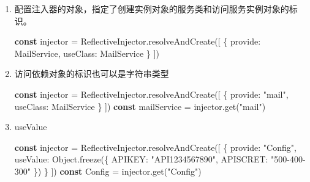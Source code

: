 \documentclass[
]{article}
\newenvironment{Shaded}{}{}
\newcommand{\BuiltInTok}[1]{#1}
\newcommand{\DataTypeTok}[1]{\textcolor[rgb]{0.56,0.13,0.00}{#1}}
\newcommand{\FunctionTok}[1]{\textcolor[rgb]{0.02,0.16,0.49}{#1}}
\newcommand{\KeywordTok}[1]{\textcolor[rgb]{0.00,0.44,0.13}{\textbf{#1}}}
\newcommand{\NormalTok}[1]{#1}
\newcommand{\OperatorTok}[1]{\textcolor[rgb]{0.40,0.40,0.40}{#1}}
\newcommand{\StringTok}[1]{\textcolor[rgb]{0.25,0.44,0.63}{#1}}
\begin{document}
\begin{enumerate}
\def\labelenumi{\arabic{enumi}.}
\item
  配置注入器的对象，指定了创建实例对象的服务类和访问服务实例对象的标识。

\begin{Shaded}
\begin{Highlighting}[]
\KeywordTok{const}\NormalTok{ injector }\OperatorTok{=}\NormalTok{ ReflectiveInjector}\OperatorTok{.}\FunctionTok{resolveAndCreate}\NormalTok{([}
\NormalTok{  \{ }\DataTypeTok{provide}\OperatorTok{:}\NormalTok{ MailService}\OperatorTok{,} \DataTypeTok{useClass}\OperatorTok{:}\NormalTok{ MailService \}}
\NormalTok{])}
\end{Highlighting}
\end{Shaded}
\item
  访问依赖对象的标识也可以是字符串类型

\begin{Shaded}
\begin{Highlighting}[]
\KeywordTok{const}\NormalTok{ injector }\OperatorTok{=}\NormalTok{ ReflectiveInjector}\OperatorTok{.}\FunctionTok{resolveAndCreate}\NormalTok{([}
\NormalTok{  \{ }\DataTypeTok{provide}\OperatorTok{:} \StringTok{"mail"}\OperatorTok{,} \DataTypeTok{useClass}\OperatorTok{:}\NormalTok{ MailService \}}
\NormalTok{])}
\KeywordTok{const}\NormalTok{ mailService }\OperatorTok{=}\NormalTok{ injector}\OperatorTok{.}\FunctionTok{get}\NormalTok{(}\StringTok{"mail"}\NormalTok{)}
\end{Highlighting}
\end{Shaded}
\item
  useValue

\begin{Shaded}
\begin{Highlighting}[]
\KeywordTok{const}\NormalTok{ injector }\OperatorTok{=}\NormalTok{ ReflectiveInjector}\OperatorTok{.}\FunctionTok{resolveAndCreate}\NormalTok{([}
\NormalTok{  \{}
    \DataTypeTok{provide}\OperatorTok{:} \StringTok{"Config"}\OperatorTok{,}
    \DataTypeTok{useValue}\OperatorTok{:} \BuiltInTok{Object}\OperatorTok{.}\FunctionTok{freeze}\NormalTok{(\{}
      \DataTypeTok{APIKEY}\OperatorTok{:} \StringTok{"API1234567890"}\OperatorTok{,}
      \DataTypeTok{APISCRET}\OperatorTok{:} \StringTok{"500{-}400{-}300"}
\NormalTok{    \})}
\NormalTok{  \}}
\NormalTok{])}
\KeywordTok{const}\NormalTok{ Config }\OperatorTok{=}\NormalTok{ injector}\OperatorTok{.}\FunctionTok{get}\NormalTok{(}\StringTok{"Config"}\NormalTok{)}
\end{Highlighting}
\end{Shaded}
\end{enumerate}
\end{document}
